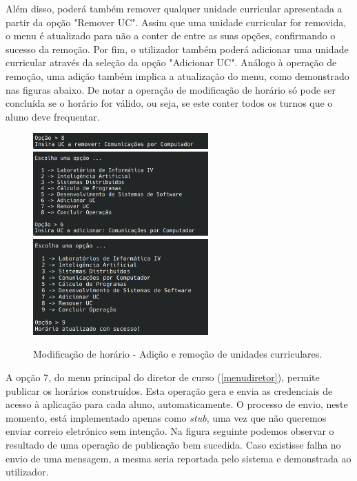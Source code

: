 \documentclass[12pt, a4paper]{article}
\begin{document}
Além disso, poderá também remover qualquer unidade curricular apresentada a partir da opção
"Remover UC". Assim que uma unidade curricular for removida, o menu é atualizado para não a conter
de entre as suas opções, confirmando o sucesso da remoção. Por fim, o utilizador também poderá
adicionar uma unidade curricular através da seleção da opção "Adicionar UC". Análogo à operação de
remoção, uma adição também implica a atualização do menu, como demonstrado nas figuras abaixo.
De notar a operação de modificação de horário só pode ser concluída se o horário for válido, ou
seja, se este conter todos os turnos que o aluno deve frequentar.

\begin{figure}[H]
    \centering
    \includegraphics[width=0.6\textwidth]{Imagens/Manual/DiretorCurso-6-2.png}
    \includegraphics[width=0.6\textwidth]{Imagens/Manual/DiretorCurso-6-3.png}
    \includegraphics[width=0.6\textwidth]{Imagens/Manual/DiretorCurso-6-4.png}
    \caption{Modificação de horário - Adição e remoção de unidades curriculares.}
\end{figure}

A opção 7, do menu principal do diretor de curso (\ref{menudiretor}), permite publicar os horários
construídos. Esta operação gera e envia as credenciais de acesso à aplicação para cada aluno,
automaticamente. O processo de envio, neste momento, está implementado apenas como \emph{stub}, uma
vez que não queremos enviar correio eletrónico sem intenção. Na figura seguinte podemos observar o
resultado de uma operação de publicação bem sucedida. Caso existisse falha no envio de uma mensagem,
a mesma seria reportada pelo sistema e demonstrada ao utilizador.
\end{document}
